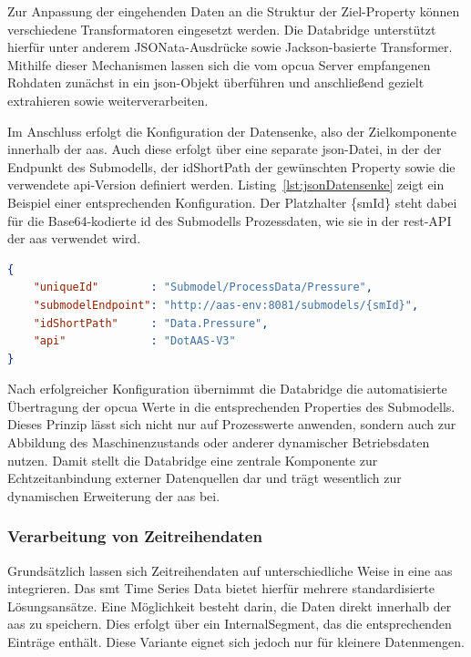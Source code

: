 Zur Anpassung der eingehenden Daten an die Struktur der Ziel-Property können verschiedene Transformatoren eingesetzt werden.
Die Databridge unterstützt hierfür unter anderem JSONata-Ausdrücke sowie Jackson-basierte Transformer.
Mithilfe dieser Mechanismen lassen sich die vom \acs{opcua} Server empfangenen Rohdaten zunächst in ein \acs{json}-Objekt überführen und anschließend gezielt extrahieren sowie weiterverarbeiten.

Im Anschluss erfolgt die Konfiguration der Datensenke, also der Zielkomponente innerhalb der \acs{aas}.
Auch diese erfolgt über eine separate \acs{json}-Datei, in der der Endpunkt des Submodells, der idShortPath der gewünschten Property sowie die verwendete \acs{api}-Version definiert werden.
Listing~\ref{lst:jsonDatensenke} zeigt ein Beispiel einer entsprechenden Konfiguration.
Der Platzhalter \{smId\} steht dabei für die Base64-kodierte \acs{id} des Submodells Prozessdaten, wie sie in der \acs{rest}-API der \acs{aas} verwendet wird.

\newpage
\begin{lstlisting}[language=json, caption={Beispielhafte \acs{json}-Konfiguration einer Datensenke}, label={lst:jsonDatensenke}]
{
    "uniqueId"        : "Submodel/ProcessData/Pressure",
    "submodelEndpoint": "http://aas-env:8081/submodels/{smId}",
    "idShortPath"     : "Data.Pressure",
    "api"             : "DotAAS-V3"
}
\end{lstlisting}

Nach erfolgreicher Konfiguration übernimmt die Databridge die automatisierte Übertragung der \acs{opcua} Werte in die entsprechenden Properties des Submodells.
Dieses Prinzip lässt sich nicht nur auf Prozesswerte anwenden, sondern auch zur Abbildung des Maschinenzustands oder anderer dynamischer Betriebsdaten nutzen.
Damit stellt die Databridge eine zentrale Komponente zur Echtzeitanbindung externer Datenquellen dar und trägt wesentlich zur dynamischen Erweiterung der \acs{aas} bei.

\subsubsection{Verarbeitung von Zeitreihendaten}
\label{sec: VerarbeitungZeitreihen}
Grundsätzlich lassen sich Zeitreihendaten auf unterschiedliche Weise in eine \acs{aas} integrieren.
Das \acs{smt} Time Series Data \cite{SpezifikationTimeSeriesData} bietet hierfür mehrere standardisierte Lösungsansätze.
Eine Möglichkeit besteht darin, die Daten direkt innerhalb der \acs{aas} zu speichern. 
Dies erfolgt über ein InternalSegment, das die entsprechenden Einträge enthält.
Diese Variante eignet sich jedoch nur für kleinere Datenmengen.


